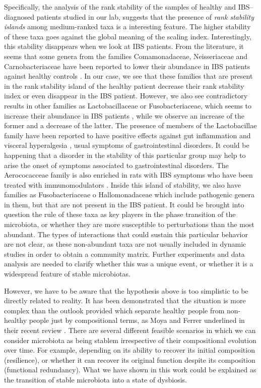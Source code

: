 Specifically, the analysis of the rank stability of the samples of healthy and IBS--diagnosed patients studied in our lab\cite{IBS}, suggests that the presence of \emph{rank stability islands} among medium-ranked taxa is a interesting feature. The higher stability of these taxa goes against the global meaning of the scaling index. Interestingly, this stability disappears when we look at IBS patients. From the literature, it seems that some genera from the families Comamonadaceae, Neisseriaceae and Carnobacteriaceae have been reported to lower their abundance in IBS patients against healthy controls \cite{sislands1}. In our case, we see that these families that are present in the rank stability island of the healthy patient decrease their rank stability index or even disappear in the IBS patient. However, we also see contradictory results in other families as Lactobacillaceae or Fusobacteriaceae, which seems to increase their abundance in IBS patients \cite{sislands2}, while we observe an increase of the former and a decrease of the latter. The presence of members of the Lactobacillae family have been reported to have positive effects against gut inflammation and visceral hyperalgesia \cite{sislands3}, usual symptoms of gastrointestinal disorders. It could be happening that a disorder in the stability of this particular group may help to arise the onset of symptoms associated to gastrointestinal disorders. The Aerococacceae family is also enriched in rats with IBS symptoms who have been treated with immunomodulators \cite{sislands4}. Inside this island of stability, we also have families as Fusobacteriaceae o Hallomonadaceae which include pathogenic genera in them, but that are not present in the IBS patient. It could be brought into question the rule of these taxa as key players in the phase transition of the microbiota, or whether they are more susceptible to perturbations than the most abundant. The types of interactions that could sustain this particular behavior are not clear, as these non-abundant taxa are not usually included in dynamic studies in order to obtain a community matrix. Further experiments and data analysis are needed to clarify whether this was a unique event, or whether it is a widespread feature of stable microbiotas. 

However, we have to be aware that the hypothesis above is too simplistic to be directly related to reality. It has been demonstrated that the situation is more complex than the outlook provided which separate healthy people from non-healthy people just by compositional terms, as Moya and Ferrer underlined in their recent review \cite{Moya_trends}. There are several different feasible scenarios in which we can consider microbiota as being stablem irrespective of their compositional evolution over time. For example, depending on its ability to recover its initial composition (resilience), or whether it can recover its original function despite its composition (functional redundancy). What we have shown in this work could be explained as the transition of stable microbiota into a state of dysbiosis.  

